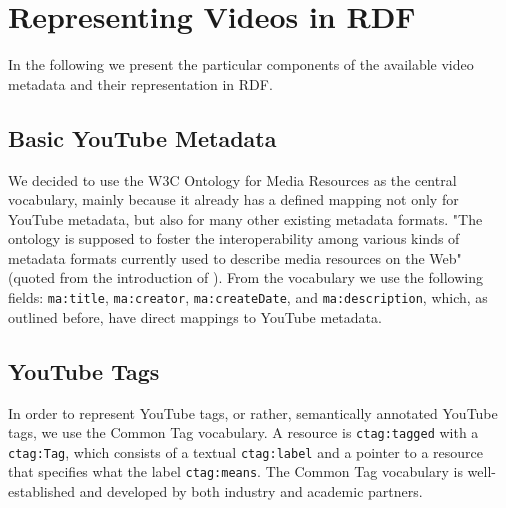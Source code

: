 \documentclass{acm_proc_article-sp}
\begin{document}
\section{Representing Videos in RDF}\label{sec:representing}
In the following we present the particular components of the available video metadata and their representation in RDF.

\subsection{Basic YouTube Metadata}\label{sec:metadata}
We decided to use the W3C Ontology for Media Resources\cite{W3C:MediaOntology} as the central vocabulary, mainly because it already has a defined mapping not only for YouTube metadata, but also for many other existing metadata formats. "The ontology is supposed to foster the interoperability among various kinds of metadata formats currently used to describe media resources on the Web" (quoted from the introduction of \cite{W3C:MediaOntology}). From the vocabulary we use the following fields: \texttt{ma:title}, \texttt{ma:creator}, \texttt{ma:createDate}, and \texttt{ma:description}, which, as outlined before, have direct mappings to YouTube metadata. 

\subsection{YouTube Tags}\label{sec:youtube}
In order to represent YouTube tags, or rather, semantically annotated YouTube tags, we use the Common Tag\cite{CommonTag:Spec} vocabulary. A resource is \texttt{ctag:tagged} with a \texttt{ctag:Tag}, which consists of a textual \texttt{ctag:label} and a pointer to a resource that specifies what the label \texttt{ctag:means}. The Common Tag vocabulary is well-established and developed by both industry and academic partners.
\end{document}
